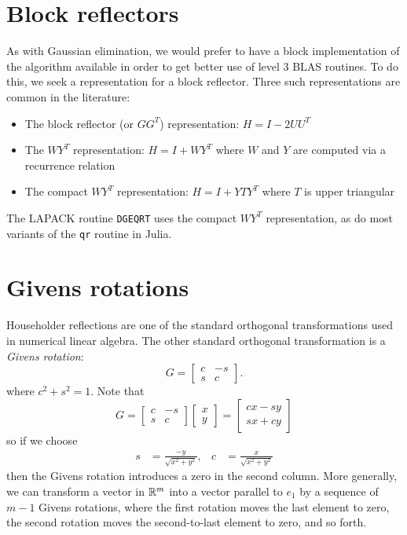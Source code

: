 \documentclass[12pt, leqno]{article} %
\begin{document}
\section{Block reflectors}

As with Gaussian elimination, we would prefer to have a block
implementation of the algorithm available in order to get better use
of level 3 BLAS routines.  To do this, we seek a representation for a
block reflector.  Three such representations are common in the
literature:
\begin{itemize}
\item The block reflector (or $GG^T$) representation: $H = I-2UU^T$
\item The $WY^T$ representation: $H = I + WY^T$ where $W$ and $Y$ are
  computed via a recurrence relation
\item The compact $WY^T$ representation: $H = I + YTY^T$ where $T$ is
  upper triangular
\end{itemize}
The LAPACK routine {\tt DGEQRT} uses the compact $WY^T$ representation, as
do most variants of the {\tt qr} routine in Julia.

\section{Givens rotations}

Householder reflections are one of the standard orthogonal
transformations used in numerical linear algebra.  The other standard
orthogonal transformation is a {\em Givens rotation}:
\[
  G = \begin{bmatrix}
    c & -s \\
    s & c
  \end{bmatrix}.
\]
where $c^2 + s^2 = 1$.  Note that
\[
  G = \begin{bmatrix}
    c & -s \\
    s & c
  \end{bmatrix}
  \begin{bmatrix}
    x \\ y
  \end{bmatrix} =
  \begin{bmatrix}
    cx - sy \\
    sx + cy
  \end{bmatrix}
\]
so if we choose
\begin{align*}
  s &= \frac{-y}{\sqrt{x^2 + y^2}}, &
  c &= \frac{x}{\sqrt{x^2+y^2}}
\end{align*}
then the Givens rotation introduces a zero in the second column.
More generally, we can transform a vector in $\mathbb{R}^m$ into a vector
parallel to $e_1$ by a sequence of $m-1$ Givens rotations, where
the first rotation moves the last element to zero, the second rotation
moves the second-to-last element to zero, and so forth.
\end{document}
